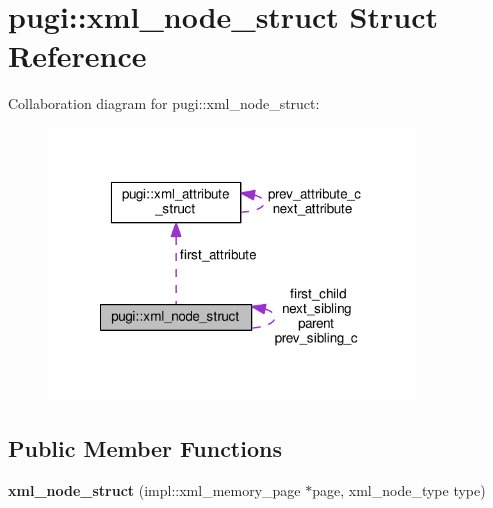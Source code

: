 \hypertarget{structpugi_1_1xml__node__struct}{\section{pugi\+:\+:xml\+\_\+node\+\_\+struct Struct Reference}
\label{structpugi_1_1xml__node__struct}
}


Collaboration diagram for pugi\+:\+:xml\+\_\+node\+\_\+struct\+:
\nopagebreak
\begin{figure}[H]
\begin{center}
\leavevmode
\includegraphics[width=275pt]{structpugi_1_1xml__node__struct__coll__graph}
\end{center}
\end{figure}
\subsection*{Public Member Functions}
\begin{DoxyCompactItemize}
\item 
\hypertarget{structpugi_1_1xml__node__struct_af9af20f835af8b6b99f9a39c93920ea6}{{\bfseries xml\+\_\+node\+\_\+struct} (impl\+::xml\+\_\+memory\+\_\+page $\ast$page, xml\+\_\+node\+\_\+type type)}\label{structpugi_1_1xml__node__struct_af9af20f835af8b6b99f9a39c93920ea6}

\end{DoxyCompactItemize}
